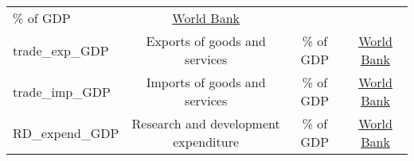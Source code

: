 \documentclass[]{article}
\begin{document}
\begin{longtable}[]{@{}lccc@{}}
\begin{minipage}[t]{0.24\columnwidth}
\% of GDP\strut
\end{minipage} & \begin{minipage}[t]{0.15\columnwidth}\centering\strut
\href{https://data.worldbank.org/indicator/NE.TRD.GNFS.ZS}{World
Bank}\strut
\end{minipage}\tabularnewline
\begin{minipage}[t]{0.14\columnwidth}\raggedright\strut
trade\_exp\_GDP\strut
\end{minipage} & \begin{minipage}[t]{0.36\columnwidth}\centering\strut
Exports of goods and services\strut
\end{minipage} & \begin{minipage}[t]{0.24\columnwidth}\centering\strut
\% of GDP\strut
\end{minipage} & \begin{minipage}[t]{0.15\columnwidth}\centering\strut
\href{https://data.worldbank.org/indicator/NE.EXP.GNFS.ZS}{World
Bank}\strut
\end{minipage}\tabularnewline
\begin{minipage}[t]{0.14\columnwidth}\raggedright\strut
trade\_imp\_GDP\strut
\end{minipage} & \begin{minipage}[t]{0.36\columnwidth}\centering\strut
Imports of goods and services\strut
\end{minipage} & \begin{minipage}[t]{0.24\columnwidth}\centering\strut
\% of GDP\strut
\end{minipage} & \begin{minipage}[t]{0.15\columnwidth}\centering\strut
\href{https://data.worldbank.org/indicator/NE.IMP.GNFS.ZS}{World
Bank}\strut
\end{minipage}\tabularnewline
\begin{minipage}[t]{0.14\columnwidth}\raggedright\strut
RD\_expend\_GDP\strut
\end{minipage} & \begin{minipage}[t]{0.36\columnwidth}\centering\strut
Research and development expenditure\strut
\end{minipage} & \begin{minipage}[t]{0.24\columnwidth}\centering\strut
\% of GDP\strut
\end{minipage} & \begin{minipage}[t]{0.15\columnwidth}\centering\strut
\href{https://data.worldbank.org/indicator/GB.XPD.RSDV.GD.ZS}{World
Bank}\strut
\end{minipage}\tabularnewline

\end{longtable}
\end{document}
